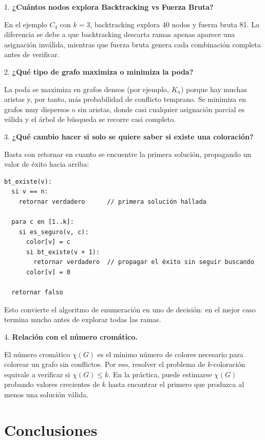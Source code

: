 \documentclass[12pt,a4paper]{article}
\begin{document}
1. \textbf{¿Cuántos nodos explora Backtracking vs Fuerza Bruta?}

En el ejemplo \(C_4\) con \(k=3\), backtracking explora 40 nodos y fuerza
bruta 81. La diferencia se debe a que backtracking descarta ramas apenas
aparece una asignación inválida, mientras que fuerza bruta genera cada
combinación completa antes de verificar.

2. \textbf{¿Qué tipo de grafo maximiza o minimiza la poda?}

La poda se maximiza en grafos densos (por ejemplo, \(K_n\)) porque hay muchas
aristas y, por tanto, más probabilidad de conflicto temprano. Se minimiza en
grafos muy dispersos o sin aristas, donde casi cualquier asignación parcial es
válida y el árbol de búsqueda se recorre casi completo.

3. \textbf{¿Qué cambio hacer si solo se quiere saber si existe una coloración?}

Basta con retornar en cuanto se encuentre la primera solución, propagando un
valor de éxito hacia arriba:

\begin{lstlisting}[style=pseudo]
bt_existe(v):
  si v == n:
    retornar verdadero      // primera solución hallada

  para c en [1..k]:
    si es_seguro(v, c):
      color[v] = c
      si bt_existe(v + 1):
        retornar verdadero  // propagar el éxito sin seguir buscando
      color[v] = 0

  retornar falso
\end{lstlisting}

Esto convierte el algoritmo de enumeración en uno de decisión: en el mejor
caso termina mucho antes de explorar todas las ramas.

4. \textbf{Relación con el número cromático.}

El número cromático \(\chi(G)\) es el mínimo número de colores necesario para
colorear un grafo sin conflictos. Por eso, resolver el problema de
\(k\)-coloración equivale a verificar si \(\chi(G)\le k\). En la práctica,
puede estimarse \(\chi(G)\) probando valores crecientes de \(k\) hasta
encontrar el primero que produzca al menos una solución válida.

\section{Conclusiones}
\end{document}
